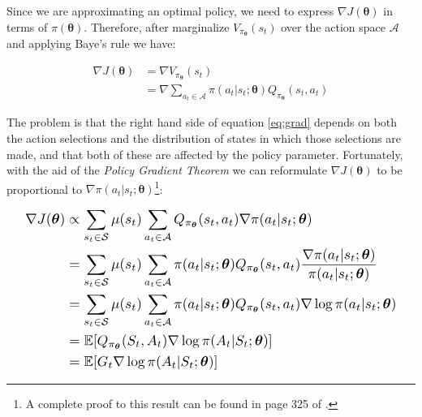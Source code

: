 \documentclass[twoside,twocolumn]{article}
\begin{document}
Since we are approximating an optimal policy, we need to express $\nabla J(\boldsymbol{\theta})$ in terms of $\pi(\boldsymbol{\theta})$. Therefore, after marginalize $V_{\pi_{\boldsymbol{\theta}}}(s_t)$ over the action space $\mathcal{A}$ and applying Baye's rule we have:

\begin{equation}
  \begin{split}
    \nabla J({\boldsymbol{\theta}}) &= \nabla V_{\pi_{\boldsymbol{\theta}}}(s_t)\\
    &= \nabla \sum_{a_t \in \mathcal{A}} \pi (a_t|s_t; \boldsymbol{\theta}) Q_{\pi_{\boldsymbol{\theta}}}(s_t,a_t)
  \end{split}
  \label{eq:grad}
\end{equation}

The problem is that the right hand side of equation \ref{eq:grad} depends on both the action selections and the distribution of states in which those selections are made, and that both of these are affected by the policy parameter. Fortunately, with the aid of the \emph{Policy Gradient Theorem} we can reformulate $\nabla J({\boldsymbol{\theta}})$ to be proportional to $\nabla \pi (a_t|s_t; \boldsymbol{\theta})$\footnote{A complete proof to this result can be found in page 325 of \cite{Sutton1998}.}:

\begin{equation*}
\resizebox{.95\linewidth}{!}{%
  $\begin{split}
    \nabla J({\boldsymbol{\theta}}) &\propto
    \sum_{s_t \in \mathcal{S}} \mu (s_t) \sum_{a_t \in \mathcal{A}} Q_{\pi_{\boldsymbol{\theta}}}(s_t,a_t) \nabla \pi (a_t|s_t; \boldsymbol{\theta}) \\
    &=\sum_{s_t \in \mathcal{S}} \mu (s_t) \sum_{a_t \in \mathcal{A}} \pi (a_t|s_t; \boldsymbol{\theta}) Q_{\pi_{\boldsymbol{\theta}}}(s_t,a_t) \frac{\nabla \pi (a_t|s_t; \boldsymbol{\theta})}{\pi (a_t|s_t; \boldsymbol{\theta})} \\
    &=\sum_{s_t \in \mathcal{S}} \mu (s_t) \sum_{a_t \in \mathcal{A}} \pi (a_t|s_t; \boldsymbol{\theta}) Q_{\pi_{\boldsymbol{\theta}}}(s_t,a_t) \nabla \log{\pi (a_t|s_t; \boldsymbol{\theta})} \\
    &= \mathbb{E}[Q_{\pi_{\boldsymbol{\theta}}}(S_t,A_t) \nabla \log{\pi (A_t|S_t; \boldsymbol{\theta})}] \\
    &= \mathbb{E}[G_t \nabla \log{\pi (A_t|S_t; \boldsymbol{\theta})}] \\
  \end{split}
  $}
\end{equation*}
\end{document}
